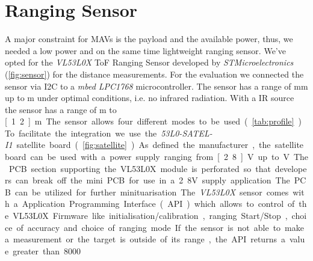 \section{Ranging Sensor}
\label{sec:ranging sensor}
A major constraint for MAVs is the payload and the available power, thus, we needed a low power and on the same time lightweight ranging sensor. We've opted for the \textit{VL53L0X} ToF Ranging Sensor developed by \textit{STMicroelectronics} (\cref{fig:sensor}) for the distance measurements. For the evaluation we connected the sensor via I2C to a \textit{mbed LPC1768} microcontroller. The sensor has a range of \unit[0]{mm} up to \unit[2]{m} under optimal conditions, i.e. no infrared radiation. With a IR source the sensor has a range of \unit[0]{m} to \unit[1.2]{m}.  The sensor allows four different modes to be used (\cref{tab:profile}). To facilitate the integration we use the \textit{53L0-SATEL-I1} satellite board (\cref{fig:satellite}). As defined the manufacturer, the satellite board can be used with a power supply ranging from \unit[2.8]{V} up to \unit[5]{V}. The PCB section supporting the VL53L0X module is perforated so that developers can break off the mini PCB for use in a 2.8V supply application. The PCB can be utilized for further minituarisation. The \textit{VL53L0X} sensor comes with a Application Programming Interface (API) which allows to control of the VL53L0X Firmware like initialisation/calibration, ranging Start/Stop, choice of accuracy and choice of ranging mode. If the sensor is not able to make a measurement or the target is outside of its range, the API returns a value greater than 8000.\\
